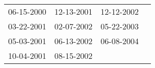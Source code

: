 \begin{supertabular}{llll}
 06-15-2000 &  12-13-2001 &  12-12-2002 \\
 03-22-2001 &  02-07-2002 &  05-22-2003 \\
 05-03-2001 &  06-13-2002 &  06-08-2004 \\
 10-04-2001 &  08-15-2002 &             \\
\end{supertabular}
